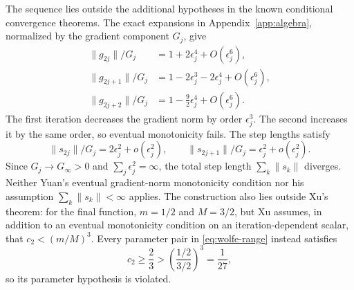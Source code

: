 \documentclass[11pt]{article}
\newcommand{\norm}[1]{\lVert #1\rVert}
\begin{document}
The sequence lies outside the additional hypotheses in the known conditional
convergence theorems.  The exact expansions in
Appendix~\ref{app:algebra}, normalized by the gradient component $G_j$, give
\begin{align*}
\norm{g_{2j}}/G_j
 &=1+2\epsilon_j^4+O(\epsilon_j^6),\\
\norm{g_{2j+1}}/G_j
 &=1-2\epsilon_j^3-2\epsilon_j^4+O(\epsilon_j^6),\\
\norm{g_{2j+2}}/G_j
 &=1-\frac92\epsilon_j^4+O(\epsilon_j^6).
\end{align*}
The first iteration decreases the gradient norm by order $\epsilon_j^3$.  The
second increases it by the same order, so eventual monotonicity fails.  The
step lengths satisfy
\[
\norm{s_{2j}}/G_j=2\epsilon_j^2+o(\epsilon_j^2),
\qquad
\norm{s_{2j+1}}/G_j=\epsilon_j^2+o(\epsilon_j^2).
\]
Since $G_j\to G_\infty>0$ and $\sum_j\epsilon_j^2=\infty$, the total step
length $\sum_k\norm{s_k}$ diverges.  Neither Yuan's eventual gradient-norm
monotonicity condition nor his assumption $\sum_k\norm{s_k}<\infty$
\cite{Yuan1995} applies.  The construction also lies outside Xu's theorem:
for the final function, $m=1/2$ and $M=3/2$, but Xu
\cite{Xu1997} assumes, in addition to an eventual monotonicity condition on an
iteration-dependent scalar, that $c_2<(m/M)^3$.  Every parameter pair in
\eqref{eq:wolfe-range} instead satisfies
\[
c_2\ge\frac23>
\left(\frac{1/2}{3/2}\right)^3=\frac1{27},
\]
so its parameter hypothesis is violated.
\end{document}

